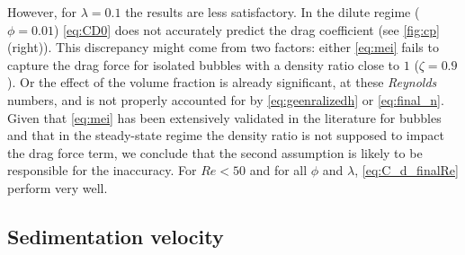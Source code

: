 However, for $\lambda = 0.1$ the results are less satisfactory. 
In the dilute regime ($\phi = 0.01$) \ref{eq:CD0} does not accurately predict the drag coefficient (see \ref{fig:cp} (right)). 
This discrepancy might come from two factors: either \ref{eq:mei} fails to capture the drag force for isolated bubbles with a density ratio close to $1$  ($\zeta  = 0.9$).
Or the effect of the volume fraction is already significant, at these \textit{Reynolds} numbers, and is not properly accounted for by \ref{eq:geenralizedh} or \ref{eq:final_n}. 
Given that \ref{eq:mei} has been extensively validated in the literature for bubbles and that in the steady-state regime the density ratio is not supposed to impact the drag force term, we conclude that the second assumption is likely to be responsible for the inaccuracy. 
For $Re < 50$ and for all $\phi$ and $\lambda$,  \ref{eq:C_d_finalRe} perform very well. 


\subsection{Sedimentation velocity}



